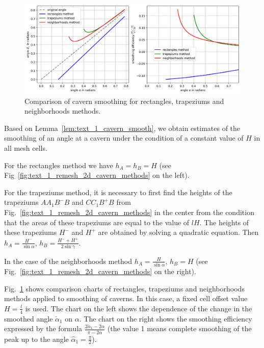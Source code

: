 \documentclass[
11pt,%
tightenlines,%
twoside,%
onecolumn,%
nofloats,%
nobibnotes,%
nofootinbib,%
superscriptaddress,%
noshowpacs,%
centertags]%
{revtex4}
\begin{document}
\begin{figure}[ht]
\setcaptionmargin{5mm}
\onelinecaptionstrue  %
\includegraphics[width=1.0\textwidth]{./pics/cavern-methods-chart.png}
\caption{Comparison of cavern smoothing for rectangles, trapeziums and neighborhoods methods.}
\label{fig:text_1_remesh_2d_cavern_methods_chart}
\end{figure}

Based on Lemma~\ref{lem:text_1_cavern_smooth}, we obtain estimates of the smoothing of an angle at a cavern under the condition of a constant value of $H$ in all mesh cells.

For the rectangles method we have $h_A = h_B = H$ (see Fig~\ref{fig:text_1_remesh_2d_cavern_methods} on the left).

For the trapeziums method, it is necessary to first find the heights of the trapeziums $AA_1B^{-}B$ and $CC_1B^{+}B$ from Fig.~\ref{fig:text_1_remesh_2d_cavern_methods} in the center from the condition that the areas of these trapeziums are equal to the value of $lH$.
The heights of these trapeziums $H^{-}$ and $H^{+}$ are obtained by solving a quadratic equation.
Then $h_A = \frac{H^{-}}{\sin \alpha}$, $h_B = \frac{H^{-} + H^{+}}{2 \sin \gamma}$.

In the case of the neighborhoods method $h_A = \frac{H}{\sin \alpha}$, $h_B = H$ (see Fig.~\ref{fig:text_1_remesh_2d_cavern_methods} on the right).

Fig.~\ref{fig:text_1_remesh_2d_cavern_methods_chart} shows comparison charts of rectangles, trapeziums and neighborhoods methods applied to smoothing of caverns.
In this case, a fixed cell offset value $H = \frac{l}{4}$ is used.
The chart on the left shows the dependence of the change in the smoothed angle $\check{\alpha}_1$ on $\alpha$.
The chart on the right shows the smoothing efficiency expressed by the formula $\frac{2 \check{\alpha}_1 - 2 \alpha}{\pi - 2 \alpha}$ (the value 1 means complete smoothing of the peak up to the angle $\hat{\alpha}_1 = \frac{\pi}{2}$).
\end{document}
